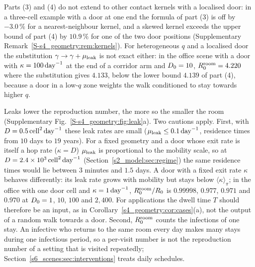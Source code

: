 Parts (3) and (4) do not extend to other contact kernels with a localised door: in a three-cell example with a
door at one end the formula of part (3) is off by $-3.0\,\%$ for a nearest-neighbour kernel, and a skewed
kernel exceeds the upper bound of part (4) by $10.9\,\%$ for one of the two door positions (Supplementary Remark~\ref{S-s4_geometry:rem:kernels}).
For heterogeneous $q$ and a localised door the substitution $\gamma\to\gamma+\mu_{\mathrm{leak}}$ is not exact either: in the
office scene with a door with $\kappa=100\,\mathrm{day}^{-1}$ at the end of a corridor arm and $D_0=10$, $R_0^{\mathrm{room}}=4.220$
where the substitution gives $4.133$, below the lower bound $4.139$ of part (4), because a door in a low-$q$
zone weights the walk conditioned to stay towards higher $q$.

Leaks lower the reproduction number, the more so the smaller the room (Supplementary Fig.~\ref{S-s4_geometry:fig:leak}a). Two
cautions apply. First, with $D=0.5\,\mathrm{cell}^2\,\mathrm{day}^{-1}$ these leak rates are small ($\mu_{\mathrm{leak}}\le0.1\,\mathrm{day}^{-1}$, residence times
from $10$ days to $19$ years). For a fixed geometry and a door whose exit rate is itself a hop rate ($\kappa=D$)
$\mu_{\mathrm{leak}}$ is proportional to the mobility scale, so at $D=2.4\times10^{3}\,\mathrm{cell}^2\,\mathrm{day}^{-1}$
(Section~\ref{s2_model:sec:regime}) the same residence times would lie between $3$ minutes and $1.5$ days. A
door with a fixed exit rate $\kappa$ behaves differently: its leak rate grows with mobility but stays below
$\langle\kappa\rangle_\pi$; in the office with one door cell and $\kappa=1\,\mathrm{day}^{-1}$, $R_0^{\mathrm{room}}/R_0$ is $0.99998$,
$0.977$, $0.971$ and $0.970$ at $D_0=1$, $10$, $100$ and $2{,}400$. For applications the dwell time $T$ should
therefore be an input, as in Corollary~\ref{s4_geometry:cor:cases}(a), not the output of a random walk towards a
door.
Second, $R_0^{\mathrm{room}}$ counts the infections of one stay. An infective who returns to the same room every day makes
many stays during one infectious period, so a per-visit number is not the reproduction number of a setting that
is visited repeatedly; Section~\ref{s6_scenes:sec:interventions} treats daily schedules.

